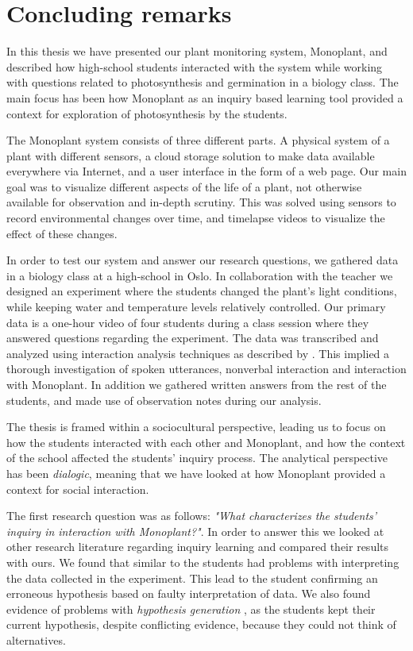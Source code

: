 \chapter{Concluding remarks}
In this thesis we have presented our plant monitoring system, Monoplant, and described how high-school students interacted with the system while working with questions related to photosynthesis and germination in a biology class. The main focus has been how Monoplant as an inquiry based learning tool provided a context for exploration of photosynthesis by the students. 

The Monoplant system consists of three different parts. A physical system of a plant with different sensors, a cloud storage solution to make data available everywhere via Internet, and a user interface in the form of a web page. Our main goal was to visualize different aspects of the life of a plant, not otherwise available for observation and in-depth scrutiny. This was solved using sensors to record environmental changes over time, and timelapse videos to visualize the effect of these changes. 

In order to test our system and answer our research questions, we gathered data in a biology class at a high-school in Oslo. In collaboration with the teacher we designed an experiment where the students changed the plant's light conditions, while keeping water and temperature levels relatively controlled. Our primary data is a one-hour video of four students during a class session where they answered questions regarding the experiment. The data was transcribed and analyzed using interaction analysis techniques as described by \citet{jordan1995interaction}. This implied a thorough investigation of spoken utterances, nonverbal interaction and interaction with Monoplant. In addition we gathered written answers from the rest of the students, and made use of observation notes during our analysis. 

The thesis is framed within a sociocultural perspective, leading us to focus on how the students interacted with each other and Monoplant, and how the context of the school affected the students' inquiry process. The analytical perspective has been \emph{dialogic}, meaning that we have looked at how Monoplant provided a context for social interaction. 

The first research question was as follows: \emph{"What characterizes the students’ inquiry in interaction with Monoplant?"}. In order to answer this we looked at other research literature regarding inquiry learning and compared their results with ours. We found that similar to \citeauthor*{klahr1993heuristics} \citetext{\citeyear{klahr1993heuristics}, referenced in \citealp{de1998scientific}} the students had problems with interpreting the data collected in the experiment. This lead to the student confirming an erroneous hypothesis based on faulty interpretation of data. We also found evidence of problems with \emph{hypothesis generation} \citep{de1998scientific}, as the students kept their current hypothesis, despite conflicting evidence, because they could not think of alternatives. 

